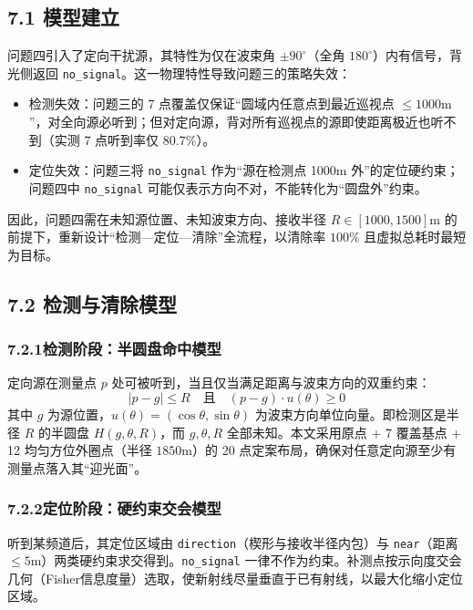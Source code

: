 \documentclass[UTF8, zihao=5,AutoFakeBold=2]{ctexart}
\begin{document}
	\subsection*{7.1 模型建立}
	问题四引入了定向干扰源，其特性为仅在波束角 $\pm 90^{\circ}$（全角 $180^{\circ}$）内有信号，背光侧返回 \texttt{no\_signal}。这一物理特性导致问题三的策略失效：
\begin{itemize}
    \item 检测失效：问题三的 7 点覆盖仅保证“圆域内任意点到最近巡视点 $\le 1000\text{m}$”，对全向源必听到；但对定向源，背对所有巡视点的源即使距离极近也听不到（实测 7 点听到率仅 $80.7\%$）。
    \item 定位失效：问题三将 \texttt{no\_signal} 作为“源在检测点 1000m 外”的定位硬约束；问题四中 \texttt{no\_signal} 可能仅表示方向不对，不能转化为“圆盘外”约束。
\end{itemize}
因此，问题四需在未知源位置、未知波束方向、接收半径 $R \in [1000, 1500]\text{m}$ 的前提下，重新设计“检测—定位—清除”全流程，以清除率 $100\%$ 且虚拟总耗时最短为目标。

	\subsection*{7.2 检测与清除模型}
	\subsubsection*{7.2.1检测阶段：半圆盘命中模型}
定向源在测量点 $p$ 处可被听到，当且仅当满足距离与波束方向的双重约束：
\begin{equation}
|p - g| \le R \quad \text{且} \quad (p - g) \cdot u(\theta) \ge 0
\end{equation}
其中 $g$ 为源位置，$u(\theta) = (\cos\theta, \sin\theta)$ 为波束方向单位向量。即检测区是半径 $R$ 的半圆盘 $H(g, \theta, R)$，而 $g, \theta, R$ 全部未知。本文采用原点 + 7 覆盖基点 + 12 均匀方位外圈点（半径 $1850\text{m}$）的 20 点定案布局，确保对任意定向源至少有测量点落入其“迎光面”。

\subsubsection*{7.2.2定位阶段：硬约束交会模型}
听到某频道后，其定位区域由 \texttt{direction}（楔形与接收半径内包）与 \texttt{near}（距离 $\le 5\text{m}$）两类硬约束求交得到。\texttt{no\_signal} 一律不作为约束。补测点按示向度交会几何（Fisher信息度量）选取，使新射线尽量垂直于已有射线，以最大化缩小定位区域。
\end{document}
